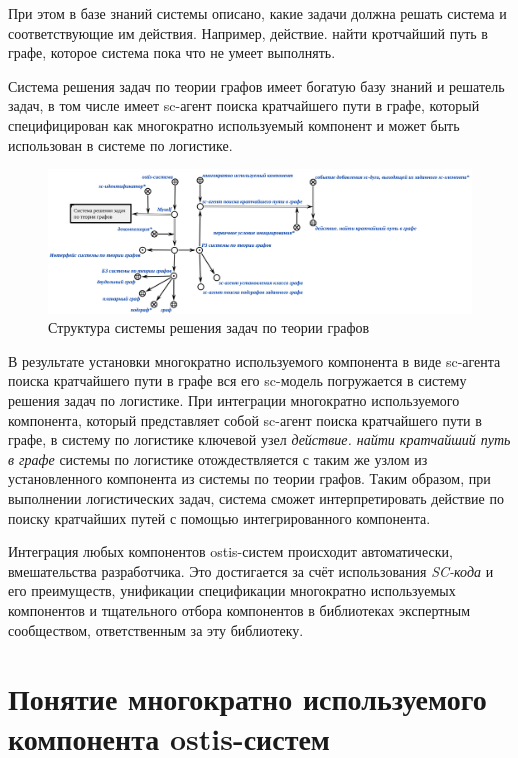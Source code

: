 При этом в базе знаний системы описано, какие задачи должна решать система и соответствующие им действия. Например, действие. найти кротчайший путь в графе, которое система пока что не умеет выполнять.

Система решения задач по теории графов имеет богатую базу знаний и решатель задач, в том числе имеет sc-агент поиска кратчайшего пути в графе, который специфицирован как многократно используемый компонент и может быть использован в системе по логистике.

\begin{figure}[H]
	\includegraphics[scale=0.4]{author/part5/figures/graph_theory_system.png}
	\caption{Структура системы решения задач по теории графов}
	\label{fig:graph_theory_system}
\end{figure}

В результате установки многократно используемого компонента в виде sc-агента поиска кратчайшего пути в графе вся его sc-модель погружается в систему решения задач по логистике. При интеграции многократно используемого компонента, который представляет собой sc-агент поиска кратчайшего пути в графе, в систему по логистике ключевой узел \textit{действие. найти кратчайший путь в графе} системы по логистике отождествляется с таким же узлом из установленного компонента из системы по теории графов. Таким образом, при выполнении логистических задач, система сможет интерпретировать действие по поиску кратчайших путей с помощью интегрированного компонента.

Интеграция любых компонентов ostis-систем происходит автоматически,  вмешательства разработчика. Это достигается за счёт использования \textit{SC-кода} и его преимуществ, унификации спецификации многократно используемых компонентов и тщательного отбора компонентов в библиотеках экспертным сообществом, ответственным за эту библиотеку.

\section{Понятие многократно используемого компонента ostis-систем}
\label{reusable_component_section}

